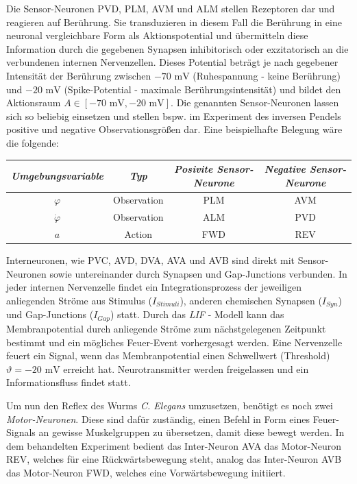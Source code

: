 	Die Sensor-Neuronen PVD, PLM, AVM und ALM stellen Rezeptoren dar und reagieren auf Berührung. Sie transduzieren in diesem Fall die Berührung in eine neuronal vergleichbare Form als Aktionspotential und übermitteln diese Information durch die gegebenen Synapsen inhibitorisch oder exzitatorisch an die verbundenen internen Nervenzellen. Dieses Potential beträgt je nach gegebener Intensität der Berührung zwischen $-70\text{ mV}$ (Ruhespannung - keine Berührung) und $-20\text{ mV}$ (Spike-Potential - maximale Berührungsintensität) und bildet den Aktionsraum $A\in[-70\text{ mV}, -20\text{ mV}]$. Die genannten Sensor-Neuronen lassen sich so beliebig einsetzen und stellen bspw. im Experiment des inversen Pendels positive und negative Observationsgrößen dar. Eine beispielhafte Belegung wäre die folgende:
	\begin{center}
	\begin{tabular}{c@{\hskip 0.5cm}c@{\hskip 0.5cm}c@{\hskip 0.5cm}c}    \toprule
		\setlength{\tabcolsep}{50pt}
		\renewcommand{\arraystretch}{1.5}
		\emph{Umgebungsvariable} & \emph{Typ}  & \emph{Posivite Sensor-Neurone} & \emph{Negative Sensor-Neurone} \\\midrule
		$\varphi$ 				 & Observation & PLM							& AVM							 \\ 
		$\dot{\varphi}$		 	 & Observation & ALM							& PVD							 \\
		$a$						 & Action	   & FWD							& REV							 \\\bottomrule
		\hline
	\end{tabular}
	\end{center}
	Interneuronen, wie PVC, AVD, DVA, AVA und AVB sind direkt mit Sensor-Neuronen sowie untereinander durch Synapsen und Gap-Junctions verbunden. In jeder internen Nervenzelle findet ein Integrationsprozess der jeweiligen anliegenden Ströme aus Stimulus ($I_{Stimuli}$), anderen chemischen Synapsen ($I_{Syn}$) und Gap-Junctions ($I_{Gap}$) statt. Durch das \textit{LIF} - Modell kann das Membranpotential durch anliegende Ströme zum nächstgelegenen Zeitpunkt bestimmt und ein mögliches Feuer-Event vorhergesagt werden. Eine Nervenzelle feuert ein Signal, wenn das Membranpotential einen Schwellwert (\glqq Threshold\grqq) $\vartheta = -20\text{ mV}$ erreicht hat. Neurotransmitter werden freigelassen und ein Informationsfluss findet statt.
	
	Um nun den Reflex des Wurms \textit{C. Elegans} umzusetzen, benötigt es noch zwei \textit{Motor-Neuronen}. Diese sind dafür zuständig, einen Befehl in Form eines Feuer-Signals an gewisse Muskelgruppen zu übersetzen, damit diese bewegt werden. In dem behandelten Experiment bedient das Inter-Neuron AVA das Motor-Neuron REV, welches für eine Rückwärtsbewegung steht, analog das Inter-Neuron AVB das Motor-Neuron FWD, welches eine Vorwärtsbewegung initiiert.
	
